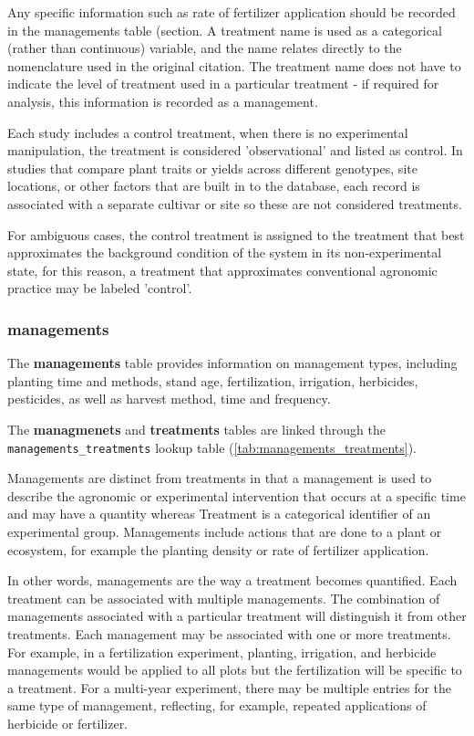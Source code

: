 \documentclass[10pt]{article}
\begin{document}
 Any specific information such as rate of fertilizer application should be recorded in the managements table (section.
 A treatment name is used as a categorical (rather than continuous) variable, and the name relates directly to the nomenclature used in the original citation.
 The treatment name does not have to indicate the level of treatment used in a particular treatment - if required for analysis, this information is recorded as a management.
 
 Each study includes a control treatment, when there is no experimental manipulation, the treatment is considered 'observational' and listed as control.
 In studies that compare plant traits or yields across different genotypes, site locations, or other factors that are built in to the database, each record is associated with a separate cultivar or site so these are not considered treatments.
 
 For ambiguous cases, the control treatment is assigned to the treatment that best approximates the background condition of the system in its non-experimental state, for this reason, a treatment that approximates conventional agronomic practice may be labeled 'control'.

\subsubsection{managements}

 The \textbf{managements} table provides information on management types, including planting time and methods, stand age, fertilization, irrigation, herbicides, pesticides, as well as harvest method, time and frequency. 

 The \textbf{managmenets} and \textbf{treatments} tables are linked through the \verb+managements_treatments+ lookup table (\ref{tab:managements_treatments}).

 Managements are distinct from treatments in that a management is used to describe the agronomic or experimental intervention that occurs at a specific time and may have a quantity whereas Treatment is a categorical identifier of an experimental group.
 Managements include actions that are done to a plant or ecosystem, for example the planting density or rate of fertilizer application.
 
 In other words, managements are the way a treatment becomes quantified. 
 Each treatment can be associated with multiple managements. 
 The combination of managements associated with a particular treatment will distinguish it from other treatments. 
 Each management may be associated with one or more treatments. 
 For example, in a fertilization experiment, planting, irrigation, and herbicide managements would be applied to all plots but the fertilization will be specific to a treatment.
For a multi-year experiment, there may be multiple entries for the same type of management, reflecting, for example, repeated applications of herbicide or fertilizer.
\end{document}
